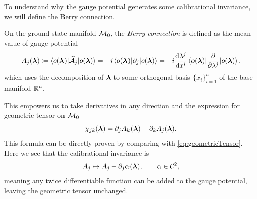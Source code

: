To understand why the gauge potential generates some calibrational invariance, we will define the Berry connection.
\begin{definition}    
    On the ground state manifold $\mathcal{M}_0$, the \emph{Berry connection} is defined as the mean value of gauge potential
    \begin{equation}
        A_j({\bm\lambda})\coloneqq \braket{o({\bm\lambda})|\mathcal{\widehat{A}}_j|o({\bm\lambda})}= -i \braket{o({\bm\lambda})|\partial_j|o({\bm\lambda})}= -i\frac{\mathrm{d} \lambda^j}{\mathrm{d} x^i} \braket{o({\bm\lambda})|\frac{\partial }{\partial \lambda^j}|o({\bm\lambda})},
        \label{eq:berryConnection}
    \end{equation}
    which uses the decomposition of ${\bm\lambda}$ to some orthogonal basis $\{x_i\}_{i=1}^n$ of the base manifold $\mathbb{R}^n$. 
\end{definition}
    

This empowers us to take derivatives in any direction and the expression for geometric tensor on $\mathcal{M}_0$
\begin{equation}
    \chi_{jk}({\bm\lambda}) = \partial_j A_k({\bm\lambda})-\partial_k A_j({\bm\lambda}).
\end{equation}
This formula can be directly proven by comparing with \ref{eq:geometricTensor}. Here we see that the calibrational invariance is 
\begin{equation}
    A_j \mapsto A_j+\partial_j \alpha({\bm\lambda}),\qquad \alpha\in\mathcal C^2,
\end{equation}
meaning any twice differentiable function can be added to the gauge potential, leaving the geometric tensor unchanged.

